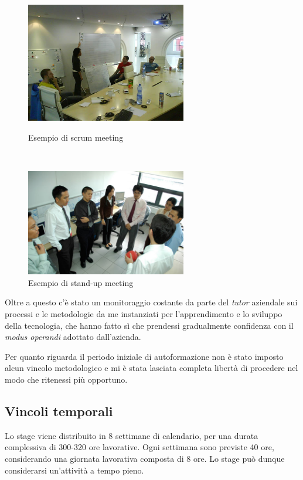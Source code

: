 \begin{figure}
\begin{minipage}[b]{7cm}
\centering
\includegraphics[width=7cm]{../immagini/scrum-meeting}
\caption{Esempio di scrum meeting}
\end{minipage}
\ \hspace{2mm} \hspace{3mm} \
\begin{minipage}[b]{7cm}
\centering
\includegraphics[width=7cm]{../immagini/stand-up-meeting}
\caption{Esempio di stand-up meeting}
\end{minipage}
\end{figure}

Oltre a questo c'è stato un monitoraggio costante da parte del \textit{tutor} aziendale sui processi e le metodologie da me instanziati per l'apprendimento e lo sviluppo della tecnologia, che hanno fatto sì che prendessi gradualmente confidenza con il \textit{modus operandi} adottato dall'azienda.

Per quanto riguarda il periodo iniziale di autoformazione non è stato imposto alcun vincolo metodologico e mi è stata lasciata completa libertà di procedere nel modo che ritenessi più opportuno. 

\subsection{Vincoli temporali}

Lo stage viene distribuito in 8 settimane di calendario, per una durata complessiva di 300-320 ore lavorative. Ogni settimana sono previste 40 ore, considerando una giornata lavorativa composta di 8 ore. Lo stage può dunque considerarsi un'attività a tempo pieno.

